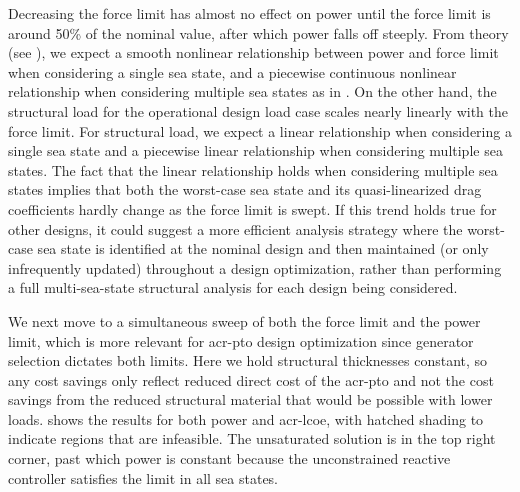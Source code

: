 Decreasing the force limit has almost no effect on power until the force limit is around 50\% of the nominal value, after which power falls off steeply.
\ifdefined\DISSERTATION
    From theory (see ), we expect a smooth nonlinear relationship between power and force limit when considering a single sea state, and a piecewise continuous nonlinear relationship when considering multiple sea states as in .
\fi
On the other hand, the structural load for the operational design load case scales nearly linearly with the force limit.
\ifdefined\DISSERTATION
    For structural load, we expect a linear relationship when considering a single sea state and a piecewise linear relationship when considering multiple sea states.
    The fact that the linear relationship holds when considering multiple sea states implies that both the worst-case sea state and its quasi-linearized drag coefficients hardly change as the force limit is swept.
    If this trend holds true for other designs, it could suggest a more efficient analysis strategy where the worst-case sea state is identified at the nominal design and then maintained (or only infrequently updated) throughout a design optimization, rather than performing a full multi-sea-state structural analysis for each design being considered.
\fi

We next move to a simultaneous sweep of both the force limit and the power limit, which is more relevant for \gls{acr-pto} design optimization since generator selection dictates both limits.
\ifdefined\DISSERTATION
    Here we hold structural thicknesses constant, so any cost savings only reflect reduced direct cost of the \gls{acr-pto} and not the cost savings from the reduced structural material that would be possible with lower loads.
\fi
{} shows the results for both power and \gls{acr-lcoe}, with hatched shading to indicate regions that are infeasible.
\ifdefined\DISSERTATION
    The unsaturated solution is in the top right corner, past which power is constant because the unconstrained reactive controller satisfies the limit in all sea states.
\fi

